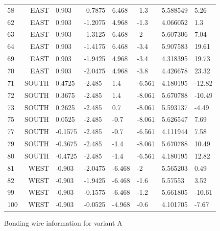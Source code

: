 \documentclass{cernatsnote}
\begin{document}
\begin{figure}
\begin{longtable}{l r l l l l l l}
58 & EAST & 0.903 & -0.7875 & 6.468 & -1.3 & 5.588549 & 5.26 \\
62 & EAST & 0.903 & -1.2075 & 4.968 & -1.3 & 4.066052 & 1.3 \\
63 & EAST & 0.903 & -1.3125 & 6.468 & -2 & 5.607306 & 7.04 \\
64 & EAST & 0.903 & -1.4175 & 6.468 & -3.4 & 5.907583 & 19.61 \\
69 & EAST & 0.903 & -1.9425 & 4.968 & -3.4 & 4.318395 & 19.73 \\
70 & EAST & 0.903 & -2.0475 & 4.968 & -3.8 & 4.426678 & 23.32 \\
71 & SOUTH & 0.4725 & -2.485 & 1.4 & -6.561 & 4.180195 & -12.82 \\
72 & SOUTH & 0.3675 & -2.485 & 1.4 & -8.061 & 5.670788 & -10.49 \\
73 & SOUTH & 0.2625 & -2.485 & 0.7 & -8.061 & 5.593137 & -4.49 \\
75 & SOUTH & 0.0525 & -2.485 & -0.7 & -8.061 & 5.626547 & 7.69 \\
77 & SOUTH & -0.1575 & -2.485 & -0.7 & -6.561 & 4.111944 & 7.58 \\
79 & SOUTH & -0.3675 & -2.485 & -1.4 & -8.061 & 5.670788 & 10.49 \\
80 & SOUTH & -0.4725 & -2.485 & -1.4 & -6.561 & 4.180195 & 12.82 \\
81 & WEST & -0.903 & -2.0475 & -6.468 & -2 & 5.565203 & 0.49 \\
82 & WEST & -0.903 & -1.9425 & -6.468 & -1.6 & 5.57553 & 3.52 \\
99 & WEST & -0.903 & -0.1575 & -6.468 & -1.2 & 5.661805 & -10.61 \\
100 & WEST & -0.903 & -0.0525 & -4.968 & -0.6 & 4.101705 & -7.67 \\

\bottomrule
\end{longtable}
\caption{Bonding wire information for variant A}

\end{figure}
\end{document}
